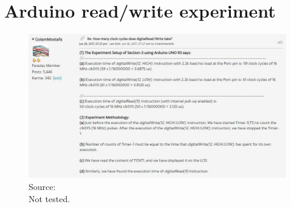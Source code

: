 \appendix

\hypertarget{AppA}{\chapter{Arduino read/write experiment}}

\begin{figure}[h]
\begin{center}
\includegraphics[width=18cm]{ProjectWS/00 - Images/ArduinoReadWriteExperiment.JPG}
\caption{Source: \cite{ArdReadWriteExp}\\ Not tested.}
\end{center}
\end{figure}